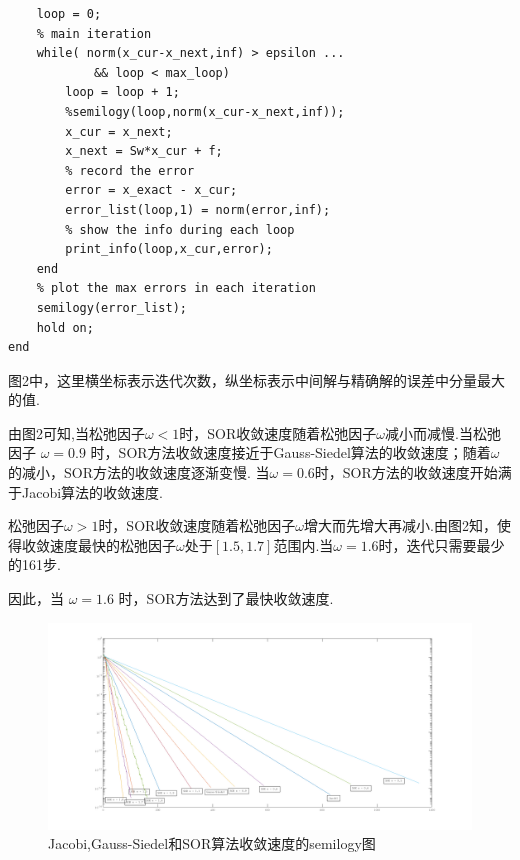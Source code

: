 \documentclass[12pt,a4paper,utf8]{ctexart}
\begin{document}
\begin{enumerate}
\begin{itemize}
\begin{lstlisting}[frame=single]
    % loop time
    loop = 0;
    % main iteration
    while( norm(x_cur-x_next,inf) > epsilon ...
            && loop < max_loop)
        loop = loop + 1;
        %semilogy(loop,norm(x_cur-x_next,inf));
        x_cur = x_next;
        x_next = Sw*x_cur + f;
        % record the error
        error = x_exact - x_cur;
        error_list(loop,1) = norm(error,inf);
        % show the info during each loop
        print_info(loop,x_cur,error);
    end
    % plot the max errors in each iteration
    semilogy(error_list);
    hold on;
end
\end{lstlisting}
    \par
    图2中，这里横坐标表示迭代次数，纵坐标表示中间解与精确解的误差中分量最大的值. 
    \par
    由图2可知,当松弛因子$\omega < 1$时，SOR收敛速度随着松弛因子$\omega$减小而减慢.当松弛因子 $\omega = 0.9$ 时，SOR方法收敛速度接近于Gauss-Siedel算法的收敛速度；随着$\omega$的减小，SOR方法的收敛速度逐渐变慢. 当$\omega = 0.6$时，SOR方法的收敛速度开始满于Jacobi算法的收敛速度.
    \par
    松弛因子$\omega > 1$时，SOR收敛速度随着松弛因子$\omega$增大而先增大再减小.由图2知，使得收敛速度最快的松弛因子$\omega$处于$[1.5,1.7]$范围内.当$\omega = 1.6$时，迭代只需要最少的161步.
    \par
    因此，当 $\omega = 1.6$ 时，SOR方法达到了最快收敛速度.
    \begin{figure}[htbp]
        \centering
        \includegraphics[scale=0.4]{pictures/all.png}
        \caption{\small{Jacobi,Gauss-Siedel和SOR算法收敛速度的semilogy图}} %
    \end{figure}
    

\end{itemize}
\end{enumerate}
\end{document}
